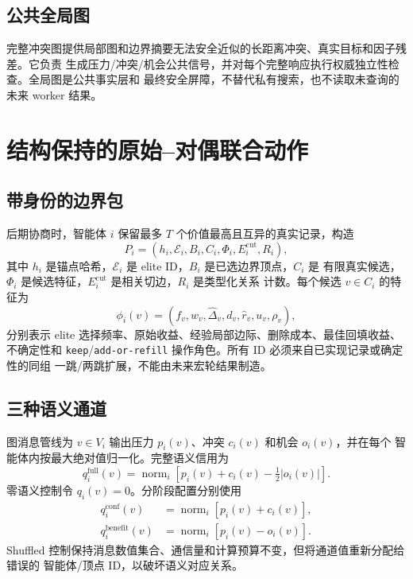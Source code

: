 \subsection{公共全局图}

完整冲突图提供局部图和边界摘要无法安全近似的长距离冲突、真实目标和因子残差。它负责
生成压力/冲突/机会公共信号，并对每个完整响应执行权威独立性检查。全局图是公共事实层和
最终安全屏障，不替代私有搜索，也不读取未查询的未来 worker 结果。

\section{结构保持的原始--对偶联合动作}

\subsection{带身份的边界包}

后期协商时，智能体 $i$ 保留最多 $T$ 个价值最高且互异的真实记录，构造
\begin{equation}
P_i=(h_i,\mathcal E_i,B_i,C_i,\Phi_i,E_i^{\mathrm{cut}},R_i),
\end{equation}
其中 $h_i$ 是锚点哈希，$\mathcal E_i$ 是 elite ID，$B_i$ 是已选边界顶点，$C_i$ 是
有限真实候选，$\Phi_i$ 是候选特征，$E_i^{\mathrm{cut}}$ 是相关切边，$R_i$ 是类型化关系
计数。每个候选 $v\in C_i$ 的特征为
\begin{equation}
\phi_i(v)=(f_v,w_v,\widehat\Delta_v,d_v,\widehat r_v,u_v,\rho_v),
\end{equation}
分别表示 elite 选择频率、原始收益、经验局部边际、删除成本、最佳回填收益、不确定性和
\texttt{keep}/\texttt{add-or-refill} 操作角色。所有 ID 必须来自已实现记录或确定性的同组
一跳/两跳扩展，不能由未来宏轮结果制造。

\subsection{三种语义通道}

图消息管线为 $v\in V_i$ 输出压力 $p_i(v)$、冲突 $c_i(v)$ 和机会 $o_i(v)$，并在每个
智能体内按最大绝对值归一化。完整语义信用为
\begin{equation}
q_i^{\mathrm{full}}(v)=
\operatorname{norm}_i\left[p_i(v)+c_i(v)-\tfrac12|o_i(v)|\right].
\end{equation}
零语义控制令 $q_i(v)=0$。分阶段配置分别使用
\begin{equation}
\begin{split}
q_i^{\mathrm{conf}}(v)&=\operatorname{norm}_i[p_i(v)+c_i(v)],\\
q_i^{\mathrm{benefit}}(v)&=\operatorname{norm}_i[p_i(v)-o_i(v)].
\end{split}
\end{equation}
Shuffled 控制保持消息数值集合、通信量和计算预算不变，但将通道值重新分配给错误的
智能体/顶点 ID，以破坏语义对应关系。

